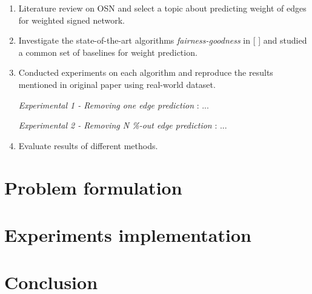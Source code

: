 \documentclass{article}
\begin{document}
\begin{enumerate}
	\item Literature review on OSN and select a topic about predicting weight of edges for weighted signed network.
	
	\item Investigate the state-of-the-art algorithms \emph{fairness-goodness} in [ ] and  studied a common set of baselines for weight prediction.
	
	\item Conducted experiments on each algorithm and reproduce the results mentioned in original paper using real-world dataset.
	
	\emph{Experimental 1 -   Removing one edge prediction} : ...
	
	\emph{Experimental 2 -  Removing N \%-out edge prediction} : ...
	
	\item Evaluate results of different methods.
\end{enumerate}

\section{Problem formulation}

\section{Experiments implementation}




















\section{Conclusion}




\end{document}
